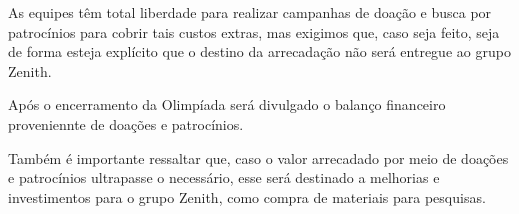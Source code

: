         \par As equipes têm total liberdade para realizar campanhas de doação e busca por patrocínios
        para cobrir tais custos extras, mas exigimos que, caso seja feito, seja de forma esteja explícito
        que o destino da arrecadação não será entregue ao grupo Zenith.

        \par Após o encerramento da Olimpíada será divulgado o balanço financeiro proveniennte de 
        doações e patrocínios.

        \par Também é importante ressaltar que, caso o valor arrecadado por meio de doações e patrocínios
        ultrapasse o necessário, esse será destinado a melhorias e investimentos para o grupo Zenith,
        como compra de materiais para pesquisas.